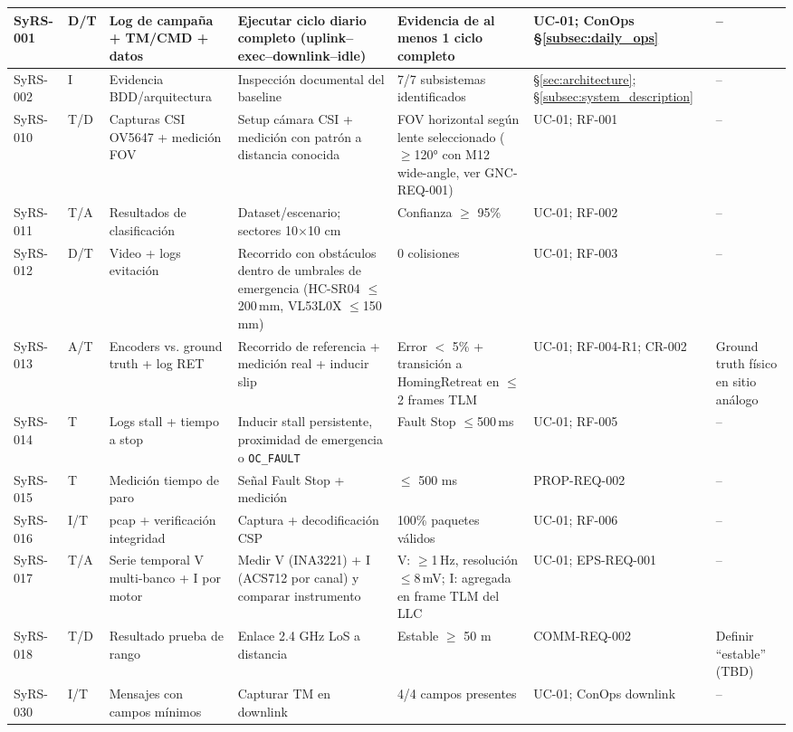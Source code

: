 \begin{landscape}
\begin{longtable}{|p{1.8cm}|p{1.4cm}|p{4.2cm}|p{4.8cm}|p{4.2cm}|p{3.2cm}|p{2.2cm}|}
SyRS-001 & D/T & Log de campaña + TM/CMD + datos & Ejecutar ciclo diario completo (uplink--exec--downlink--idle) & Evidencia de al menos 1 ciclo completo & UC-01; ConOps \S\ref{subsec:daily_ops} & --\\ \hline
SyRS-002 & I & Evidencia BDD/arquitectura & Inspección documental del baseline & 7/7 subsistemas identificados & \S\ref{sec:architecture}; \S\ref{subsec:system_description} & --\\ \hline
SyRS-010 & T/D & Capturas CSI OV5647 + medición FOV & Setup cámara CSI + medición con patrón a distancia conocida & FOV horizontal según lente seleccionado ($\ge$120° con M12 wide-angle, ver GNC-REQ-001) & UC-01; RF-001 & --\\ \hline
SyRS-011 & T/A & Resultados de clasificación & Dataset/escenario; sectores 10$\times$10 cm & Confianza $\ge$ 95\% & UC-01; RF-002 & --\\ \hline
SyRS-012 & D/T & Video + logs evitación & Recorrido con obstáculos dentro de umbrales de emergencia (HC-SR04 $\le$200\,mm, VL53L0X $\le$150\,mm) & 0 colisiones & UC-01; RF-003 & --\\ \hline
SyRS-013 & A/T & Encoders vs. ground truth + log RET & Recorrido de referencia + medición real + inducir slip & Error $<$ 5\% + transición a HomingRetreat en $\le$2 frames TLM & UC-01; RF-004-R1; CR-002 & Ground truth físico en sitio análogo\\ \hline
SyRS-014 & T & Logs stall + tiempo a stop & Inducir stall persistente, proximidad de emergencia o \texttt{OC\_FAULT} & Fault Stop $\le$500\,ms & UC-01; RF-005 & --\\ \hline
SyRS-015 & T & Medición tiempo de paro & Señal Fault Stop + medición & $\le$ 500 ms & PROP-REQ-002 & --\\ \hline
SyRS-016 & I/T & pcap + verificación integridad & Captura + decodificación CSP & 100\% paquetes válidos & UC-01; RF-006 & --\\ \hline
SyRS-017 & T/A & Serie temporal V multi-banco + I por motor & Medir V (INA3221) + I (ACS712 por canal) y comparar instrumento & V: $\ge$1\,Hz, resolución $\le$8\,mV; I: agregada en frame TLM del LLC & UC-01; EPS-REQ-001 & --\\ \hline
SyRS-018 & T/D & Resultado prueba de rango & Enlace 2.4 GHz LoS a distancia & Estable $\ge$ 50 m & COMM-REQ-002 & Definir “estable” (TBD)\\ \hline
SyRS-030 & I/T & Mensajes con campos mínimos & Capturar TM en downlink & 4/4 campos presentes & UC-01; ConOps downlink & --\\ \hline

\end{longtable}
\end{landscape}
